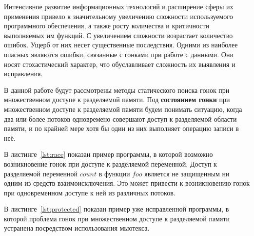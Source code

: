 \Introduction

Интенсивное развитие информационных технологий и расширение сферы их применения привело к значительному увеличению сложности используемого программного обеспечения, а также росту количества и критичности выполняемых им функций. С увеличением сложности возрастает количество ошибок. Ущерб от них несет существенные последствия. Одними из наиболее опасных являются ошибки, связанные с гонками при работе с данными. Они носят стохастический характер, что обуславливает сложность их выявления и исправления.

В данной работе будут рассмотрены методы статического поиска гонок при множественном доступе к разделяемой памяти. 
Под \textbf{состоянием гонки} при множественном доступе к разделяемой памяти будем понимать ситуацию, когда два или более потоков одновремено совершают доступ к разделяемой области памяти, и по крайней мере хотя бы один из них выполняет операцию записи в неё.

В листинге~\ref{lst:race} показан пример программы, в которой возможно возникновение гонок при доступе к разделяемой переменной. Доступ к разделяемой переменной $count$ в функции $foo$ является не защищенным ни одним из средств взаимоисключения. Это может привести к возникновению гонок при одновременном доступе к ней из различных потоков.

В листинге~\ref{lst:protected} показан пример уже исправленной программы, в которой проблема гонок при множественном доступе к разделяемой памяти устранена посредством использования мьютекса.




